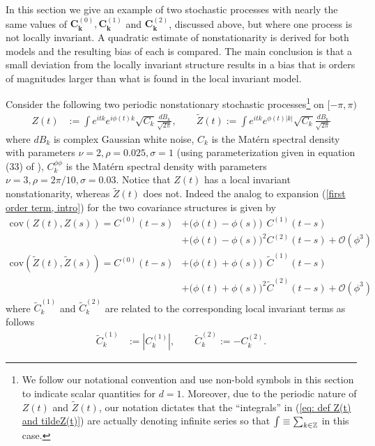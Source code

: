 \documentclass[10pt,noinfoline]{imsart}
\newcommand{\bs}{\boldsymbol}
\begin{document}
In this section we give an example of two stochastic processes with nearly the same values of $\bs C_{\bs k}^{(0)}, \bs C_{\bs k}^{(1)}$ and $\bs C_{\bs k}^{(2)}$, discussed above, but where one process is not locally invariant.  A quadratic estimate of nonstationarity is derived for both models and the resulting bias of each is compared. The main conclusion is that a small deviation from the locally invariant structure results in a bias that is orders of magnitudes larger than what is found in the local invariant model.

Consider the following two periodic nonstationary stochastic processes\footnote{We follow our notational convention and use non-bold symbols in this section to indicate scalar quantities for $d=1$. Moreover, due to the periodic nature of $Z(t)$ and $\tilde Z(t)$, our notation dictates that the ``integrals'' in (\ref{eq: def Z(t) and tildeZ(t)}) are actually denoting infinite series so that $\int \equiv \sum_{k\in \Bbb Z}$ in this case.}
 on $[-\pi,\pi)$
\begin{align}
\label{eq: def Z(t) and tildeZ(t)}
Z(t) &:= \int  e^{i tk} e^{i\phi(t)k }\sqrt{C_k}\frac{dB_{k}}{\sqrt{2\pi}},\qquad    \widetilde Z(t) := \int    e^{i tk} e^{\phi(t)|k| }\sqrt{C_k}\frac{dB_{k}}{\sqrt{2\pi}}
\end{align}
where  $dB_{k}$ is complex Gaussian white noise, $C_k$ is the Mat\'ern spectral density  with parameters $\nu = 2, \rho = 0.025, \sigma = 1$ (using parameterization given in equation (33) of \cite{stein2012interpolation}),  $C^{\phi\phi}_k$ is the Mat\'ern spectral density with parameters $\nu = 3 , \rho = 2\pi/10, \sigma = 0.03$. Notice that $Z(t)$ has a local invariant nonstationarity, whereas $\widetilde Z(t)$ does not. Indeed the analog to expansion (\ref{first order term, intro}) for the two covariance structures is given by
\begin{align}
\text{cov}(Z(t),Z(s))= C^{(0)}(t\!-\!s) &+ \big(\phi(t)-\phi(s)\big)^{\phantom{2}} C^{(1)}(t\!-\!s) \nonumber\\
									 &+ \big(\phi(t)-\phi(s)\big)^2 C^{(2)}(t\!-\!s) + \mathcal O(\phi^3)\label{eq: cov expansion cov(Z(t),Z(s))}\\
\text{cov}(\widetilde Z(t),\widetilde Z(s)) = C^{(0)}(t\!-\!s) &+ \big(\phi(t)+\phi(s)\big)^{\phantom{2}} \widetilde C^{(1)}(t\!-\!s) \nonumber\\
															&+ \big(\phi(t)+\phi(s)\big)^2 \widetilde C^{(2)}(t\!-\!s) + \mathcal O(\phi^3)\label{eq: cov expansion cov(widetilde Z(t),widetilde Z(s))}
\end{align}
where $\widetilde C^{(1)}_k$ and $\widetilde C^{(2)}_k$ are related to the corresponding local invariant terms as follows
\begin{align}
\widetilde C^{(1)}_k &:= |C^{(1)}_k|, \qquad
\widetilde C^{(2)}_k := -C^{(2)}_k.
\label{eq: comparison of invariant and non-invariant expansions}
\end{align}
\end{document}
